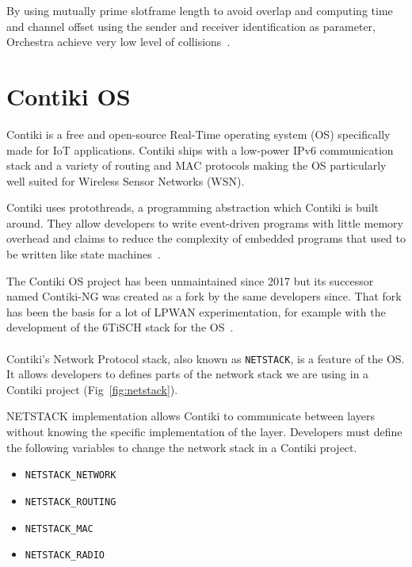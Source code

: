 By using mutually prime slotframe length to avoid overlap and computing time
and channel offset using the sender and receiver identification as parameter,
Orchestra achieve very low level of collisions~\cite{duquennoy2015}.

\section{Contiki OS}

Contiki is a free and open-source Real-Time operating system (OS) specifically made
for IoT applications. Contiki ships with a low-power IPv6 communication stack
and a variety of routing and MAC protocols making the OS particularly well
suited for Wireless Sensor Networks (WSN).

Contiki uses protothreads, a programming abstraction which Contiki is
built around.
They allow developers to write event-driven programs with little memory overhead and
claims to reduce the complexity of embedded programs that used to be written 
like state machines~\cite{10.1145/1182807.1182811}.

The Contiki OS project has been unmaintained since 2017 but its
successor named Contiki-NG was created as a fork by the same developers since.
That fork has been the basis for a lot of LPWAN experimentation, for example 
with the development of the 6TiSCH stack for the OS~\cite{Duquennoy2017TSCHA6}.

\paragraph{}

Contiki's Network Protocol stack, also known as \lstinline{NETSTACK}, is a
feature of the OS.
It allows developers to defines parts of the network stack we are using in a Contiki
project (Fig~\ref{fig:netstack}).

NETSTACK implementation allows Contiki to communicate between layers without 
knowing the specific implementation of the layer.
Developers must define the following variables to change the network stack 
in a Contiki project.

\begin{itemize}
  \item \lstinline{NETSTACK_NETWORK}
  \item \lstinline{NETSTACK_ROUTING}
  \item \lstinline{NETSTACK_MAC}
  \item \lstinline{NETSTACK_RADIO}
\end{itemize}

